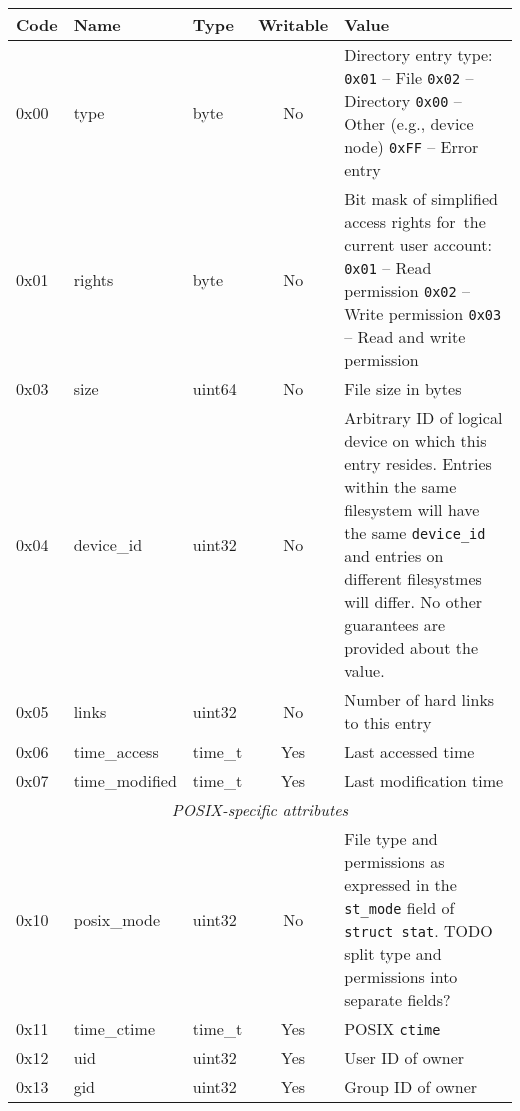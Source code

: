 \begin{table}[p]
\begin{center}

\def\tline#1#2#3{
{\ttfamily #1} & {\ttfamily #2} & {\ttfamily #3}
}
\begin{tabular}{|lllcp{6cm}|}
	\hline
	Code & Name & Type & Writable & Value \\
	\hline
	\tline{0x00}{type}{byte} & No &
		Directory entry type: \newline
		{\tt 0x01} -- File \newline
		{\tt 0x02} -- Directory \newline
		{\tt 0x00} -- Other (e.g., device node) \newline
		{\tt 0xFF} -- Error entry
		\\
	\tline{0x01}{rights}{byte} & No &
		Bit mask of simplified access rights for~the current user account:\newline
		{\tt 0x01} -- Read permission \newline
		{\tt 0x02} -- Write permission \newline
		{\tt 0x03} -- Read and write permission
		\\
	\tline{0x03}{size}{uint64} & No & File size in bytes \\
	\tline{0x04}{device\_id}{uint32} & No &
		Arbitrary ID of logical device on which this entry resides.
		Entries within the same filesystem will have the same {\tt device\_id}
		and entries on different filesystmes will differ. No other guarantees
		are provided about the value.
		\\
	\tline{0x05}{links}{uint32} & No & Number of hard links to this entry \\
	\tline{0x06}{time\_access}{time\_t} & Yes & Last accessed time \\
	\tline{0x07}{time\_modified}{time\_t} & Yes & Last modification time \\

	\hline
	\multicolumn{5}{|c|}{\textit{POSIX-specific attributes}} \\
	\hline

	\tline{0x10}{posix\_mode}{uint32} & No &
		File type and permissions as expressed in the {\tt st\_mode} field
		of {\tt struct stat}.\newline
		TODO split type and permissions into separate fields?
		\\
	\tline{0x11}{time\_ctime}{time\_t} & Yes & POSIX {\tt ctime} \\
	\tline{0x12}{uid}{uint32} & Yes & User ID of owner \\
	\tline{0x13}{gid}{uint32} & Yes & Group ID of owner \\


\end{tabular}
\end{center}
\end{table}
